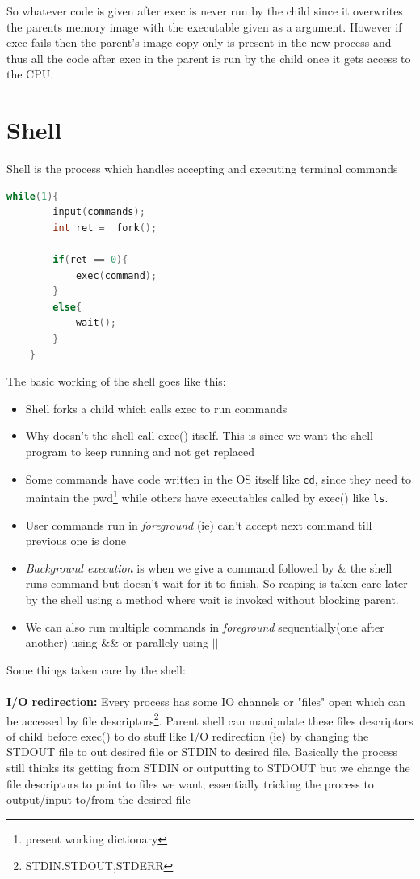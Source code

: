 \documentclass[12pt]{article}
\newcommand{\tbox}[1]{\noindent\fbox{\parbox{\textwidth}{#1}}}
\begin{document}
So whatever code is given after exec is never run by the child since it overwrites the parents memory image with the executable given as a argument. However if 
exec fails then the parent's image copy only is present in the new process and thus all the code after exec in the parent is run by the child once it gets access to the CPU. 


\noindent\tbox{
    \begin{center}
    \textbf{\Huge Lecture 5}
    \end{center}
}
\section{Shell}
Shell is the process which handles accepting and executing terminal commands
\begin{lstlisting}[language=C++,caption = Shell code]
    while(1){
        input(commands);
        int ret =  fork();

        if(ret == 0){
            exec(command);
        }
        else{
            wait();
        }
    }  
\end{lstlisting}
The basic working of the shell goes like this:
\begin{itemize}[topsep=0pt, partopsep=0pt, itemsep=0pt, parsep=0pt]
    \item Shell forks a child which calls exec to run commands
    \item Why doesn't the shell call exec() itself. This is since we want the shell program to keep running and not get replaced
    \item Some commands have code written in the OS itself like \texttt{cd}, since they need to maintain the pwd\footnote{present working dictionary} while others
    have executables called by exec() like \texttt{ls}.
    \item User commands run in \textit{foreground} (ie) can't accept next command till previous one is done
    \item \textit{Background execution} is when we give a command followed by \& the shell runs command but doesn't wait for it to finish.
    So reaping is taken care later by the shell using a method where wait is invoked without blocking parent.
    \item We can also run multiple commands in \textit{foreground} sequentially(one after another) using \&\& or parallely using $||$ 
\end{itemize}


Some things taken care by the shell:\\\\
\textbf{I/O redirection:}
Every process has some IO channels or "files" open which can be accessed by file descriptors\footnote{STDIN.STDOUT,STDERR}.
Parent shell can manipulate these files descriptors of child before exec() to do stuff like I/O redirection (ie) by changing the STDOUT file to out desired file or STDIN to desired file.
Basically the process still thinks its getting from STDIN or outputting to STDOUT but we change the file descriptors to point to files we want, essentially tricking the process to output/input to/from the desired file
\end{document}
